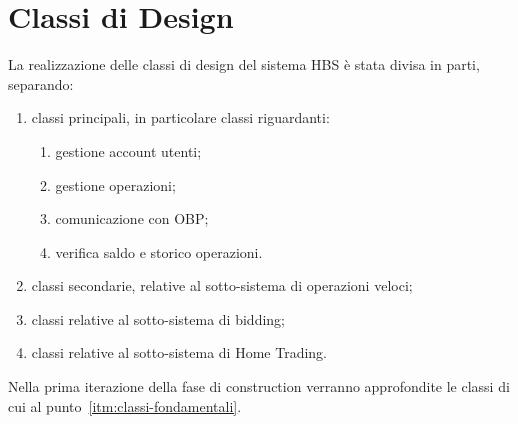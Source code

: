 
\section{Classi di Design}

La realizzazione delle classi di design del sistema HBS \`e stata divisa in parti, separando:
\begin{enumerate}
	\item \label{itm:classi-fondamentali} classi principali, in particolare classi riguardanti:
		\begin{enumerate}
			\item gestione account utenti;
			\item gestione operazioni;
			\item comunicazione con OBP;
			\item verifica saldo e storico operazioni.
		\end{enumerate}
	\item classi secondarie, relative al sotto-sistema di operazioni veloci;
	\item classi relative al sotto-sistema di bidding;
	\item classi relative al sotto-sistema di Home Trading.
\end{enumerate}

Nella prima iterazione della fase di construction verranno approfondite le classi di cui al punto~\ref{itm:classi-fondamentali}.



